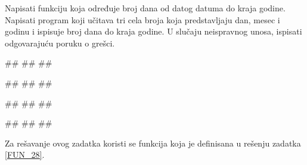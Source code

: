 \begin{Exercise}[label=FUN_27] 
Napisati funkciju  koja određuje broj dana od datog datuma do kraja
godine. Napisati program koji učitava tri cela broja koja predstavljaju dan, mesec i godinu i ispisuje broj
dana do kraja godine. 
U slučaju neispravnog unosa, ispisati odgovarajuću poruku o grešci.

\begin{miditest}
\begin{upotreba}{1}
#\naslovInt#
##
##
\end{upotreba}
\end{miditest}
\begin{miditest}
\begin{upotreba}{2}
#\naslovInt#
##
##
\end{upotreba}
\end{miditest}

\begin{miditest}
\begin{upotreba}{3}
#\naslovInt#
##
##
\end{upotreba}
\end{miditest}
\begin{miditest}
\begin{upotreba}{4}
#\naslovInt#
##
##
\end{upotreba}
\end{miditest}

\end{Exercise}
\ifresenja 
\begin{Answer}[ref=FUN_27]

Za rešavanje ovog zadatka koristi se funkcija  koja je definisana u rešenju zadatka \ref{FUN_28}.
\end{Answer} 
\fi

